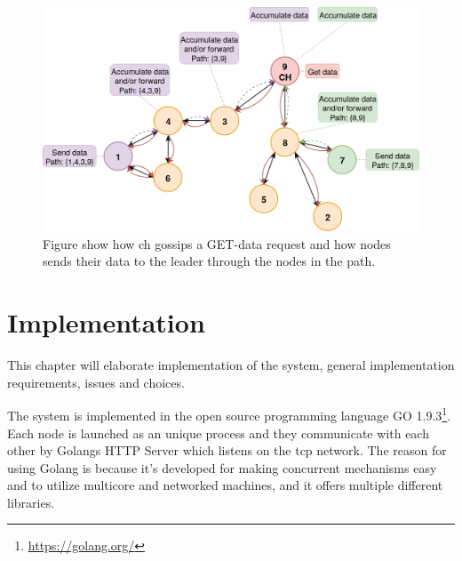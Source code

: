 \documentclass[USenglish]{uit-thesis}
\begin{document}

\begin{figure}
\centering
\includegraphics[width=\textwidth]{gatherSendData1.png}
\caption{Figure show how \gls{ch} gossips a GET-data request and how  nodes sends their data to the leader through the nodes in the path.}
\label{fig:gaterSendData}
\end{figure}



\chapter{Implementation}

This chapter will elaborate implementation of the system, general implementation requirements, issues and choices. 

The system is implemented in the open source programming language GO 1.9.3\footnote{\url{https://golang.org/}}. Each node is launched as an unique process and they communicate with each other by Golangs HTTP Server which listens on the \gls{tcp} network. The reason for using Golang is because it's developed for making concurrent mechanisms easy and to utilize multicore and networked machines, and it offers multiple different libraries.
\end{document}
